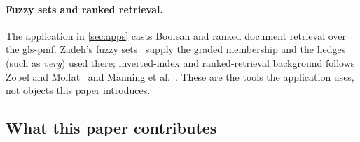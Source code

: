 \documentclass[ ../main.tex]{subfiles}
\begin{document}
\paragraph{Fuzzy sets and ranked retrieval.}
The application in \cref{sec:apps} casts Boolean and ranked document retrieval over the \gls{gls-pmf}. Zadeh's fuzzy sets~\cite{zadeh1965} supply the graded membership and the hedges (such as \emph{very}) used there; inverted-index and ranked-retrieval background follows Zobel and Moffat~\cite{zobel2006} and Manning et al.~\cite{manning}. These are the tools the application uses, not objects this paper introduces.

\subsection{What this paper contributes}
\label{sec:related_contribution}
\end{document}
